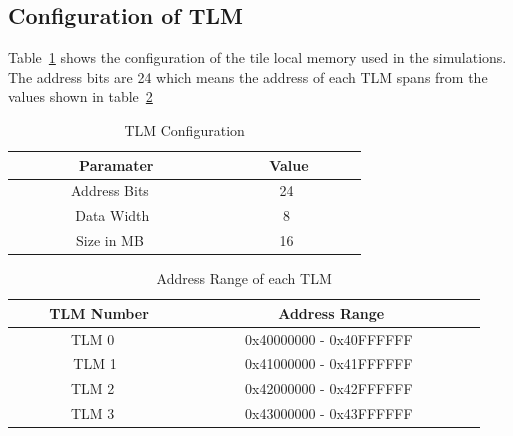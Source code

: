 \documentclass{listhesis}
\begin{document}
\subsection{Configuration of TLM}
Table~\ref{table:Size} shows the configuration of the tile local memory used in the simulations. The address bits are 24 which means the address of each TLM spans from the values shown in table~\ref{table:addressTLM}
\begin{table}[h!]
\begin{center}
 \begin{tabular}{|| c | c ||} 
 \hline
 \ \textbf{Paramater} & \textbf{Value}  \\ [0.5 ex] 
 \hline\hline
 \ \ \ \ \ \ \ \ Address Bits \ \ \ \ \ \ \ \ & \ \ \ \ \ \ \ \ 24 \ \ \ \ \ \ \ \ \\ 
 \hline
 \ \ \ \ \ \ \ \ Data Width\ \ \ \ \ \ \ \ & \ \ \ \ \ \ \ \ 8 \ \ \ \ \ \ \ \ \\
 \hline
 \ \ \ \ \ \ \ \ Size in MB \ \ \ \ \ \ \ \ & \ \ \ \ \ \ \ \ 16 \ \ \ \ \ \ \ \  \\
 \hline
\end{tabular}
 \caption{TLM Configuration}
 \label{table:Size}
\end{center}
\end{table}

\begin{table}[h!]
\begin{center}
 \begin{tabular}{|| c | c ||} 
 \hline
 \ \textbf{TLM Number} & \textbf{Address Range}  \\ [0.5 ex] 
 \hline\hline
 \ \ \ \ \ \ \ \ TLM 0 \ \ \ \ \ \ \ \ & \ \ \ \ \ \ \ \ 0x40000000 - 0x40FFFFFF \ \ \ \ \ \ \ \ \\ 
 \hline
 \ \ \ \ \ \ \ \ TLM 1\ \ \ \ \ \ \ \ & \ \ \ \ \ \ \ \ 0x41000000 - 0x41FFFFFF  \ \ \ \ \ \ \ \ \\
 \hline
 \ \ \ \ \ \ \ \ TLM 2 \ \ \ \ \ \ \ \ & \ \ \ \ \ \ \ \ 0x42000000 - 0x42FFFFFF  \ \ \ \ \ \ \ \  \\
 \hline
  \ \ \ \ \ \ \ \ TLM 3 \ \ \ \ \ \ \ \ & \ \ \ \ \ \ \ \ 0x43000000 - 0x43FFFFFF  \ \ \ \ \ \ \ \  \\
  \hline
\end{tabular}
 \caption{Address Range of each TLM}
 \label{table:addressTLM}
\end{center}
\end{table}
\end{document}
